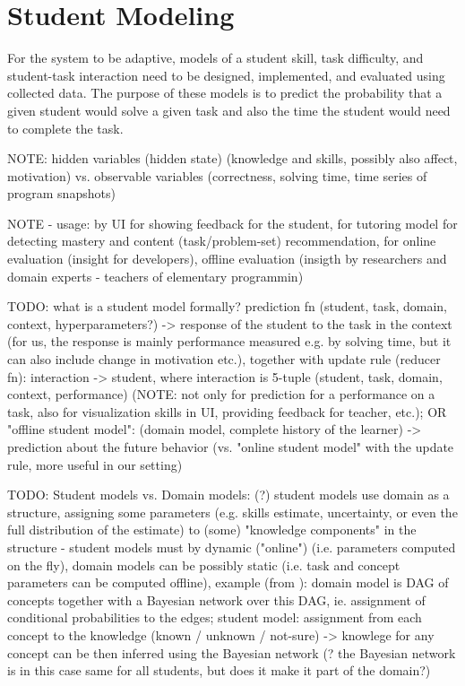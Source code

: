 \section{Student Modeling}
\label{sec:student-modeling}

For the system to be adaptive, models of
  a student skill, task difficulty, and student-task interaction
  need to be designed, implemented, and evaluated using collected data.
The purpose of these models is to predict the probability that a given student
  would solve a given task
  and also the time the student would need to complete the task.

NOTE: hidden variables (hidden state) (knowledge and skills, possibly also affect, motivation)
vs. observable variables (correctness, solving time, time series of program snapshots)


NOTE - usage: by UI for showing feedback for the student, for tutoring model for detecting mastery and content (task/problem-set) recommendation, for online evaluation (insight for developers), offline evaluation (insigth by researchers and domain experts - teachers of elementary programmin)


TODO: what is a student model formally?
prediction fn (student, task, domain, context, hyperparameters?) -> response of the student to the task in the context (for us, the response is mainly performance measured e.g. by solving time, but it can also include change in motivation etc.),
together with update rule (reducer fn): interaction -> student,
where interaction is 5-tuple (student, task, domain, context, performance)
(NOTE: not only for prediction for a performance on a task, also for
visualization skills in UI, providing feedback for teacher, etc.);
OR "offline student model": (domain model, complete history of the learner) -> prediction about the future behavior (vs. "online student model" with the update rule, more useful in our setting)


TODO: Student models vs. Domain models: (?) student models use domain as a
structure, assigning some parameters (e.g. skills estimate, uncertainty, or even
the full distribution of the estimate) to (some) "knowledge components" in the structure
- student models must by dynamic ("online") (i.e. parameters computed on the fly),
domain models can be possibly static (i.e. task and concept parameters can be computed offline),
example (from \cite{its-programming}): domain model is DAG of concepts together with a
Bayesian network over this DAG, ie. assignment of conditional probabilities to the edges;
student model: assignment from each concept to the knowledge (known / unknown / not-sure) -> knowlege for any concept can be then inferred using the Bayesian network
(? the Bayesian network is in this case same for all students, but does it make it part of the domain?)


